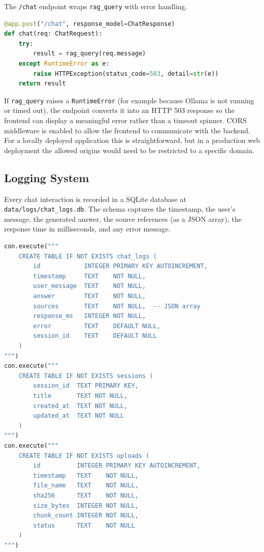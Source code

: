 The \texttt{/chat} endpoint wraps \texttt{rag\_query} with error handling.

\begin{lstlisting}[language=Python]
@app.post("/chat", response_model=ChatResponse)
def chat(req: ChatRequest):
    try:
        result = rag_query(req.message)
    except RuntimeError as e:
        raise HTTPException(status_code=503, detail=str(e))
    return result
\end{lstlisting}

If \texttt{rag\_query} raises a \texttt{RuntimeError} (for example because Ollama is not running or timed out), the endpoint converts it into an HTTP 503 response so the frontend can display a meaningful error rather than a timeout spinner. CORS middleware is enabled to allow the frontend to communicate with the backend. For a locally deployed application this is straightforward, but in a production web deployment the allowed origins would need to be restricted to a specific domain.

\subsection{Logging System}
\label{sec:impl-logging}

Every chat interaction is recorded in a SQLite database at \texttt{data/logs/chat\_logs.db}. The schema captures the timestamp, the user's message, the generated answer, the source references (as a JSON array), the response time in milliseconds, and any error message.

\begin{lstlisting}[language=Python]
con.execute("""
    CREATE TABLE IF NOT EXISTS chat_logs (
        id            INTEGER PRIMARY KEY AUTOINCREMENT,
        timestamp     TEXT    NOT NULL,
        user_message  TEXT    NOT NULL,
        answer        TEXT    NOT NULL,
        sources       TEXT    NOT NULL,  -- JSON array
        response_ms   INTEGER NOT NULL,
        error         TEXT    DEFAULT NULL,
        session_id    TEXT    DEFAULT NULL
    )
""")
con.execute("""
    CREATE TABLE IF NOT EXISTS sessions (
        session_id  TEXT PRIMARY KEY,
        title       TEXT NOT NULL,
        created_at  TEXT NOT NULL,
        updated_at  TEXT NOT NULL
    )
""")
con.execute("""
    CREATE TABLE IF NOT EXISTS uploads (
        id          INTEGER PRIMARY KEY AUTOINCREMENT,
        timestamp   TEXT    NOT NULL,
        file_name   TEXT    NOT NULL,
        sha256      TEXT    NOT NULL,
        size_bytes  INTEGER NOT NULL,
        chunk_count INTEGER NOT NULL,
        status      TEXT    NOT NULL
    )
""")
\end{lstlisting}

